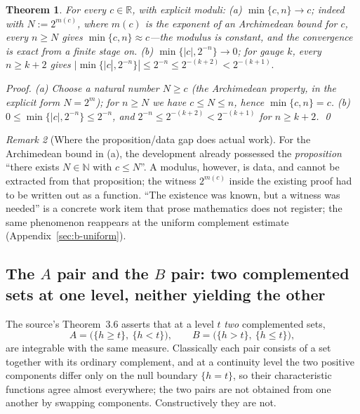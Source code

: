 \documentclass[11pt]{article}
\newtheorem{theorem}{Theorem}[section]
\theoremstyle{definition}
\theoremstyle{remark}
\newtheorem{remark}[theorem]{Remark}
\begin{document}
\begin{theorem}
\label{thm:b-dirac}
For every $c\in\mathbb{R}$, with explicit moduli:
(a) $\min\{c,n\}\to c$; indeed with $N:=2^{m(c)}$, where $m(c)$ is the exponent of an Archimedean bound for $c$, every $n\ge N$ gives $\min\{c,n\}\approx c$---the modulus is \emph{constant}, and the convergence is exact from a finite stage on.
(b) $\min\{|c|,2^{-n}\}\to0$; for gauge $k$, every $n\ge k+2$ gives
\(
|\min\{|c|,2^{-n}\}|\le2^{-n}\le2^{-(k+2)}<2^{-(k+1)} .
\)

\emph{Proof.}  (a) Choose a natural number $N\ge c$ (the Archimedean property, in the explicit form $N=2^{m}$); for $n\ge N$ we have $c\le N\le n$, hence $\min\{c,n\}=c$.  (b) $0\le\min\{|c|,2^{-n}\}\le 2^{-n}$, and $2^{-n}\le2^{-(k+2)}<2^{-(k+1)}$ for $n\ge k+2$. \qed
\end{theorem}

\begin{remark}[Where the proposition/data gap does actual work]
\label{rem:b-propdata}
For the Archimedean bound in (a), the development already possessed the \emph{proposition} ``there exists $N\in\mathbb{N}$ with $c\le N$''.  A modulus, however, is data, and cannot be extracted from that proposition; the witness $2^{m(c)}$ inside the existing proof had to be written out as a function.  ``The existence was known, but a witness was needed'' is a concrete work item that prose mathematics does not register; the same phenomenon reappears at the uniform complement estimate (Appendix~\ref{sec:b-uniform}).
\end{remark}

\subsection{\texorpdfstring{The $A$ pair and the $B$ pair: two complemented sets at one level, neither yielding the other}{The A pair and the B pair: two complemented sets at one level, neither yielding the other}}
\label{sec:b-mirror}

The source's Theorem~3.6 asserts that at a level $t$ \emph{two} complemented sets,
\[
A=\bigl(\{h\ge t\},\ \{h<t\}\bigr),\qquad B=\bigl(\{h>t\},\ \{h\le t\}\bigr),
\]
are integrable with the same measure.  Classically each pair consists of a set together with its ordinary complement, and at a continuity level the two positive components differ only on the null boundary $\{h=t\}$, so their characteristic functions agree almost everywhere; the two pairs are not obtained from one another by swapping components.  Constructively they are not.
\end{document}
